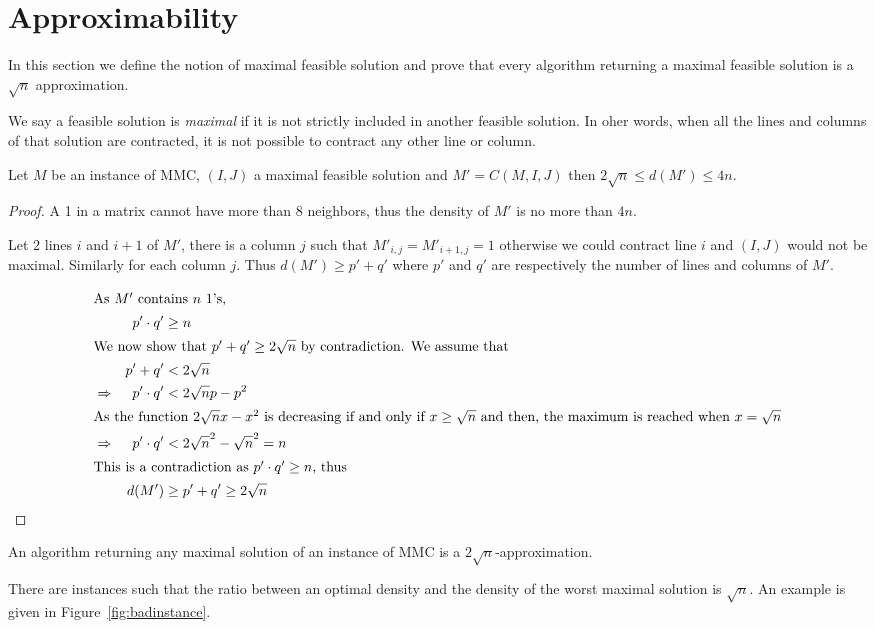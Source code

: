 \section{Approximability}

In this section we define the notion of maximal feasible solution and prove that every algorithm returning a maximal feasible solution is a $\sqrt{n}$ approximation.

\begin{definition}
We say a feasible solution is \emph{maximal} if it is not strictly included in another feasible solution. In oher words, when all the lines and columns of that solution are contracted, it is not possible to contract any other line or column.
\end{definition}

\begin{theorem}
\label{theo:bounds}
Let $M$ be an instance of MMC, $(I,J)$ a maximal feasible solution and $M' = C(M,I,J)$ then $2 \sqrt{n} \leq d(M') \leq 4n$.
\end{theorem}
\begin{proof}
A 1 in a matrix cannot have more than $8$ neighbors, thus the density of $M'$ is no more than $4n$.

Let $2$ lines $i$ and $i+1$ of $M'$, there is a column $j$ such that $M'_{i,j} = M'_{i+1,j} = 1$ otherwise we could contract line $i$ and $(I,J)$ would not be maximal. Similarly for each column $j$. Thus $d(M') \geq p'+q'$ where $p'$ and $q'$ are respectively the number of lines and columns of $M'$.

\begin{align*}
\intertext{As $M'$ contains $n$ 1's,}
&& p'\cdot q' &\geq n\\
\intertext{We now show that $p'+q' \geq 2 \sqrt{n}$ by contradiction. We assume that}
&& p' + q' &< 2 \sqrt{n}\\
&\Rightarrow& p' \cdot q' &< 2\sqrt{n}p - p^2\\
\intertext{As the function $2\sqrt{n} x - x^2$ is decreasing if and only if $x \geq \sqrt{n}$ and then, the maximum is reached when $x = \sqrt{n}$}
&\Rightarrow& p' \cdot q' &< 2 \sqrt{n}^2 - \sqrt{n}^2 = n \\
\intertext{This is a contradiction as $p' \cdot q' \geq n$, thus}
&& d(M') &\geq p' + q' \geq 2 \sqrt{n}
\end{align*}

\end{proof}


\begin{corol}
An algorithm returning any maximal solution of an instance of MMC is a $2\sqrt{n}$-approximation.
\end{corol}

\begin{remark}
\label{rmk:badinstance}
There are instances such that the ratio between an optimal density and the density of the worst maximal solution is $\sqrt{n}$. An example is given in Figure~\ref{fig:badinstance}.


\end{remark}

